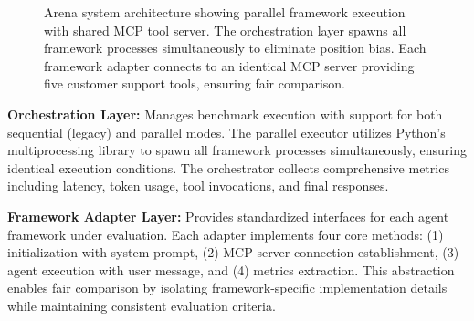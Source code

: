 \documentclass[sigconf,nonacm]{acmart}
\begin{document}
\begin{figure}[t]
\caption{Arena system architecture showing parallel framework execution with shared MCP tool server. The orchestration layer spawns all framework processes simultaneously to eliminate position bias. Each framework adapter connects to an identical MCP server providing five customer support tools, ensuring fair comparison.}
\label{fig:architecture}
\end{figure}

\textbf{Orchestration Layer:} Manages benchmark execution with support for both sequential (legacy) and parallel modes. The parallel executor utilizes Python's multiprocessing library to spawn all framework processes simultaneously, ensuring identical execution conditions. The orchestrator collects comprehensive metrics including latency, token usage, tool invocations, and final responses.

\textbf{Framework Adapter Layer:} Provides standardized interfaces for each agent framework under evaluation. Each adapter implements four core methods: (1) initialization with system prompt, (2) MCP server connection establishment, (3) agent execution with user message, and (4) metrics extraction. This abstraction enables fair comparison by isolating framework-specific implementation details while maintaining consistent evaluation criteria.
\end{document}
